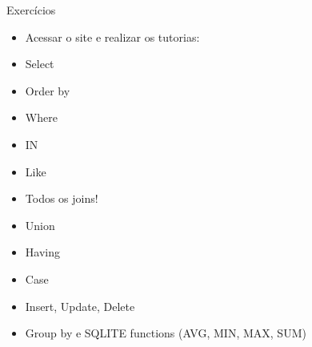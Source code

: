 \begin{frame}
	\begin{block}{Exercícios}
			\begin{itemize}
				\item Acessar o site \href{http://www.sqlitetutorial.net/}{\color{blue}{SqliteTutorial}} e realizar os tutorias:
				\item Select
				\item Order by
				\item Where
				\item IN
				\item Like
				\item Todos os joins!
				\item Union
				\item Having 
				\item Case
				\item Insert, Update, Delete
				\item Group by e SQLITE functions (AVG, MIN, MAX, SUM)	
			\end{itemize}
	\end{block}
\end{frame}

